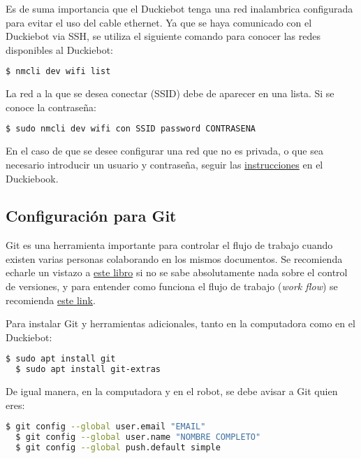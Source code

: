 \documentclass[12pt]{article}
\begin{document}
Es de suma importancia que el Duckiebot tenga una red inalambrica configurada para evitar el uso del cable ethernet. Ya que se haya comunicado con el Duckiebot via SSH, se utiliza el siguiente comando para conocer las redes disponibles al Duckiebot:

\begin{lstlisting}[language=bash]
  $ nmcli dev wifi list
\end{lstlisting}

La red a la que se desea conectar (SSID) debe de aparecer en una lista. Si se conoce la contraseña:

\begin{lstlisting}[language=bash]
  $ sudo nmcli dev wifi con SSID password CONTRASENA
\end{lstlisting}

En el caso de que se desee configurar una red que no es privada, o que sea necesario introducir un usuario y contraseña, seguir las \href{https://bit.ly/2JkTQtb}{instrucciones} en el Duckiebook.


\subsection{Configuración para Git}

Git es una herramienta importante para controlar el flujo de trabajo cuando existen varias personas colaborando en los mismos documentos. Se recomienda echarle un vistazo a \href{https://git-scm.com/book/en/v2}{este libro} si no se sabe absolutamente nada sobre el control de versiones, y para entender como funciona el flujo de trabajo (\textit{work flow}) se recomienda \href{https://nvie.com/posts/a-successful-git-branching-model/}{este link}.

Para instalar Git y herramientas adicionales, tanto en la computadora como en el Duckiebot:

\begin{lstlisting}[language=bash]
  $ sudo apt install git
  $ sudo apt install git-extras
\end{lstlisting}

De igual manera, en la computadora y en el robot, se debe avisar a Git quien eres:

\begin{lstlisting}[language=bash]
  $ git config --global user.email "EMAIL"
  $ git config --global user.name "NOMBRE COMPLETO"
  $ git config --global push.default simple
\end{lstlisting}
\end{document}
